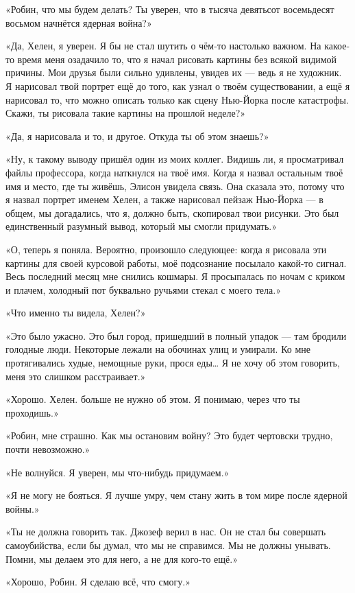 \documentclass[a5paper, 9pt,
final, openany, twoside=true]{memoir}
\begin{document}
«Робин, что мы будем делать? Ты уверен, что в тысяча девятьсот восемьдесят восьмом начнётся ядерная война?»

«Да, Хелен, я уверен. Я бы не стал шутить о чём-то настолько важном. На какое-то время меня озадачило то, что я начал рисовать картины без всякой видимой причины. Мои друзья были сильно удивлены, увидев их — ведь я не художник. Я нарисовал твой портрет ещё до того, как узнал о твоём существовании, а ещё я нарисовал то, что можно описать только как сцену Нью-Йорка после катастрофы. Скажи, ты рисовала такие картины на прошлой неделе?»

«Да, я нарисовала и то, и другое. Откуда ты об этом знаешь?»

«Ну, к такому выводу пришёл один из моих коллег. Видишь ли, я просматривал файлы профессора, когда наткнулся на твоё имя. Когда я назвал остальным твоё имя и место, где ты живёшь, Элисон увидела связь. Она сказала это, потому что я назвал портрет именем Хелен, а также нарисовал пейзаж Нью-Йорка — в общем, мы догадались, что я, должно быть, скопировал твои рисунки. Это был единственный разумный вывод, который мы смогли придумать.»

«О, теперь я поняла. Вероятно, произошло следующее: когда я рисовала эти картины для своей курсовой работы, моё подсознание посылало какой-то сигнал. Весь последний месяц мне снились кошмары. Я просыпалась по ночам с криком и плачем, холодный пот буквально ручьями стекал с моего тела.»

«Что именно ты видела, Хелен?»

«Это было ужасно. Это был город, пришедший в полный упадок — там бродили голодные люди. Некоторые лежали на обочинах улиц и умирали. Ко мне протягивались худые, немощные руки, прося еды… Я не хочу об этом говорить, меня это слишком расстраивает.»

«Хорошо. Хелен. больше не нужно об этом. Я понимаю, через что ты проходишь.»

«Робин, мне страшно. Как мы остановим войну? Это будет чертовски трудно, почти невозможно.»

«Не волнуйся. Я уверен, мы что-нибудь придумаем.»

«Я не могу не бояться. Я лучше умру, чем стану жить в том мире после ядерной войны.»

«Ты не должна говорить так. Джозеф верил в нас. Он не стал бы совершать самоубийства, если бы думал, что мы не справимся. Мы не должны унывать. Помни, мы делаем это для него, а не для кого-то ещё.»

«Хорошо, Робин. Я сделаю всё, что смогу.»
\end{document}
